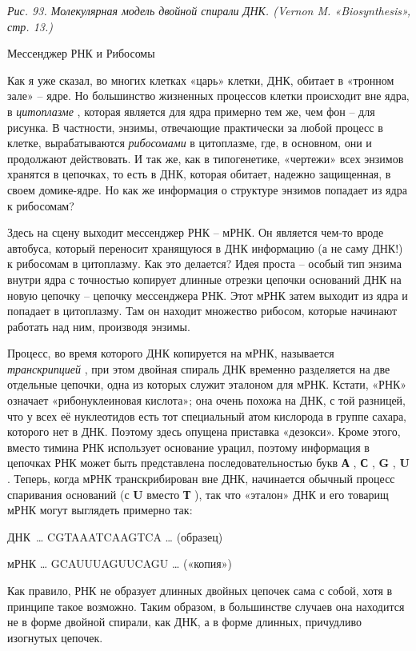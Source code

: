 \documentclass[../main.tex]{subfiles}
\begin{document}
\emph{Рис. 93. Молекулярная модель двойной спирали ДНК\@. (Vernon M. «Biosynthesis», стр. 13.)}

Мессенджер РНК и Рибосомы

Как я уже сказал, во многих клетках «царь» клетки, ДНК, обитает в «тронном зале» \--- ядре. Но большинство жизненных процессов клетки происходит вне ядра, в \emph{цитоплазме} , которая является для ядра примерно тем же, чем фон \--- для рисунка. В частности, энзимы, отвечающие практически за любой процесс в клетке, вырабатываются \emph{рибосомами} в цитоплазме, где, в основном, они и продолжают действовать. И так же, как в типогенетике, «чертежи» всех энзимов хранятся в цепочках, то есть в ДНК, которая обитает, надежно защищенная, в своем домике-ядре. Но как же информация о структуре энзимов попадает из ядра к рибосомам?

Здесь на сцену выходит мессенджер РНК \--- мРНК\@. Он является чем-то вроде автобуса, который переносит хранящуюся в ДНК информацию (а не саму ДНК!) к рибосомам в цитоплазму. Как это делается? Идея проста \--- особый тип энзима внутри ядра с точностью копирует длинные отрезки цепочки оснований ДНК на новую цепочку \--- цепочку мессенджера РНК\@. Этот мРНК затем выходит из ядра и попадает в цитоплазму. Там он находит множество рибосом, которые начинают работать над ним, производя энзимы.

Процесс, во время которого ДНК копируется на мРНК, называется \emph{транскрипцией} , при этом двойная спираль ДНК временно разделяется на две отдельные цепочки, одна из которых служит эталоном для мРНК\@. Кстати, «РНК» означает «рибонуклеиновая кислота»; она очень похожа на ДНК, с той разницей, что у всех её нуклеотидов есть тот специальный атом кислорода в группе сахара, которого нет в ДНК\@. Поэтому здесь опущена приставка «дезокси». Кроме этого, вместо тимина РНК использует основание урацил, поэтому информация в цепочках РНК может быть представлена последовательностью букв \textbf{А} , \textbf{С} , \textbf{G} , \textbf{U} . Теперь, когда мРНК транскрибирован вне ДНК, начинается обычный процесс спаривания оснований (с \textbf{U} вместо \textbf{Т} ), так что «эталон» ДНК и его товарищ мРНК могут выглядеть примерно так:

ДНК~\ldots{} CGTAAATCAAGTCA \ldots{} (образец)

мРНК \ldots{} GCAUUUAGUUCAGU \ldots{} («копия»)

Как правило, РНК не образует длинных двойных цепочек сама с собой, хотя в принципе такое возможно. Таким образом, в большинстве случаев она находится не в форме двойной спирали, как ДНК, а в форме длинных, причудливо изогнутых цепочек.
\end{document}

